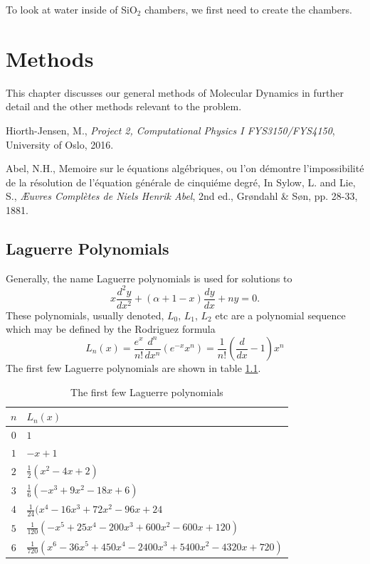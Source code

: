 \documentclass[10pt, a4paper]{report}
\begin{document}
To look at water inside of SiO$_2$ chambers, we first need to create the chambers.



\chapter{Methods}

This chapter discusses our general methods of Molecular Dynamics in further detail and the other methods relevant to the problem.


\begin{thebibliography}{9}

	Hiorth-Jensen, M.,
	\emph{Project 2, Computational Physics I FYS3150/FYS4150},
	University of Oslo,
	2016.
	
	Abel, N.H.,
	Memoire sur le équations algébriques, ou l'on démontre l'impossibilité de la résolution de l'équation générale de cinquiéme degré,
	In Sylow, L. and Lie, S., 
	\emph{Æuvres Complètes de Niels Henrik Abel}, 2nd ed.,
	Grøndahl \& Søn, pp. 28-33,
	1881.

\end{thebibliography}

\begin{appendix}
\section{Laguerre Polynomials}
\label{app:laguerre}
Generally, the name Laguerre polynomials is used for solutions to 
\begin{equation}
x\frac{d^2y}{dx^2}+(\alpha+1-x)\frac{dy}{dx} + ny = 0.
\end{equation}
These polynomials, usually denoted, $L_0$, $L_1$, $L_2$ etc are a polynomial sequence which may be defined by the Rodriguez formula
\begin{equation}
L_n(x) = \frac{e^x}{n!}\frac{d^n}{dx^n}(e^{-x}x^n)=\frac{1}{n!}\left(\frac{d}{dx} -1 \right)x^n
\end{equation}
The first few Laguerre polynomials are shown in table \ref{tab:laguerre}.

\begin{table}[ht]
	\centering
	\caption{The first few Laguerre polynomials}
	\begin{tabular}{cl} \hline
	$n$ & $L_n(x)$  \\ \hline
	$0$ & $1$ \\
	$1$ & $-x+1$ \\
	$2$ & $\frac{1}{2}(x^2-4x+2)$ \\
	$3$ & $\frac{1}{6}(-x^3+9x^2-18x+6)$ \\
	$4$ & $\frac{1}{24}(x^4-16x^3+72x^2-96x+24$ \\
	$5$ & $\frac{1}{120}(-x^5+25x^4-200x^3+600x^2-600x+120) $ \\
	$6$ & $\frac{1}{720}(x^6-36x^5+450x^4-2400x^3+5400x^2-4320x+720)$ \\ \hline
	\end{tabular}
	\label{tab:laguerre}
\end{table}

\end{appendix}
\end{document}
